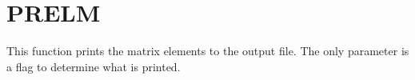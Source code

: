 \section{PRELM}
\label{sect:prelm}

\noindent This function prints the matrix elements to the output file. The
only parameter is a flag to determine what is printed.\\

